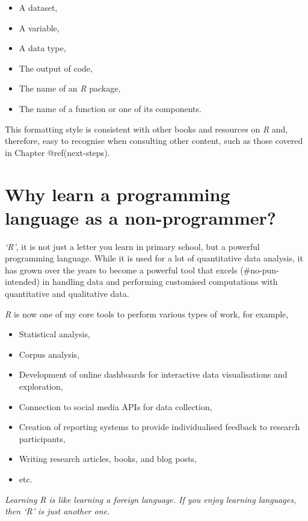 \documentclass[
  letterpaper,
]{krantz}
\providecommand{\tightlist}{%
  \setlength{\itemsep}{0pt}\setlength{\parskip}{0pt}}\usepackage{longtable,booktabs,array}
\renewenvironment{quote}{\begin{VF}}{\end{VF}}
\begin{document}
\begin{itemize}
\item
  A dataset,
\item
  A variable,
\item
  A data type,
\item
  The output of code,
\item
  The name of an \emph{R} package,
\item
  The name of a function or one of its components.
\end{itemize}

This formatting style is consistent with other books and resources on
\emph{R} and, therefore, easy to recognise when consulting other
content, such as those covered in Chapter @ref(next-steps).


\chapter{Why learn a programming language as a
non-programmer?}\label{why-learn-a-programming-language-as-a-non-programmer}

\emph{`R'}, it is not just a letter you learn in primary school, but a
powerful programming language. While it is used for a lot of
quantitative data analysis, it has grown over the years to become a
powerful tool that excels (\#no-pun-intended) in handling data and
performing customised computations with quantitative and qualitative
data.

\emph{R} is now one of my core tools to perform various types of work,
for example,

\begin{itemize}
\tightlist
\item
  Statistical analysis,
\item
  Corpus analysis,
\item
  Development of online dashboards for interactive data visualisations
  and exploration,
\item
  Connection to social media APIs for data collection,
\item
  Creation of reporting systems to provide individualised feedback to
  research participants,
\item
  Writing research articles, books, and blog posts,
\item
  etc.
\end{itemize}

\begin{quote}
\emph{Learning R is like learning a foreign language. If you enjoy
learning languages, then `R' is just another one.}
\end{quote}
\end{document}
